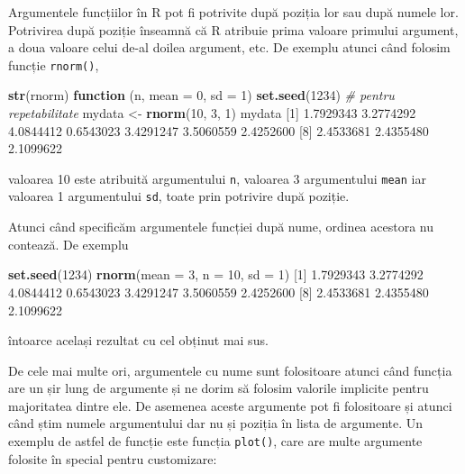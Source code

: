 \documentclass[]{article}
\newenvironment{Shaded}{\begin{snugshade}}{\end{snugshade}}
\newcommand{\CommentTok}[1]{\textcolor[rgb]{0.56,0.35,0.01}{\textit{#1}}}
\newcommand{\ControlFlowTok}[1]{\textcolor[rgb]{0.13,0.29,0.53}{\textbf{#1}}}
\newcommand{\DataTypeTok}[1]{\textcolor[rgb]{0.13,0.29,0.53}{#1}}
\newcommand{\DecValTok}[1]{\textcolor[rgb]{0.00,0.00,0.81}{#1}}
\newcommand{\FloatTok}[1]{\textcolor[rgb]{0.00,0.00,0.81}{#1}}
\newcommand{\KeywordTok}[1]{\textcolor[rgb]{0.13,0.29,0.53}{\textbf{#1}}}
\newcommand{\NormalTok}[1]{#1}
\newcommand{\StringTok}[1]{\textcolor[rgb]{0.31,0.60,0.02}{#1}}
\begin{document}
Argumentele funcțiilor în R pot fi potrivite după poziția lor sau după
numele lor. Potrivirea după poziție înseamnă că R atribuie prima valoare
primului argument, a doua valoare celui de-al doilea argument, etc. De
exemplu atunci când folosim funcție \texttt{rnorm()},

\begin{Shaded}
\begin{Highlighting}[]
\KeywordTok{str}\NormalTok{(rnorm)}
\ControlFlowTok{function}\NormalTok{ (n, }\DataTypeTok{mean =} \DecValTok{0}\NormalTok{, }\DataTypeTok{sd =} \DecValTok{1}\NormalTok{)  }
\KeywordTok{set.seed}\NormalTok{(}\DecValTok{1234}\NormalTok{) }\CommentTok{# pentru repetabilitate}
\NormalTok{mydata <-}\StringTok{ }\KeywordTok{rnorm}\NormalTok{(}\DecValTok{10}\NormalTok{, }\DecValTok{3}\NormalTok{, }\DecValTok{1}\NormalTok{) }
\NormalTok{mydata}
\NormalTok{ [}\DecValTok{1}\NormalTok{] }\FloatTok{1.7929343} \FloatTok{3.2774292} \FloatTok{4.0844412} \FloatTok{0.6543023} \FloatTok{3.4291247} \FloatTok{3.5060559} \FloatTok{2.4252600}
\NormalTok{ [}\DecValTok{8}\NormalTok{] }\FloatTok{2.4533681} \FloatTok{2.4355480} \FloatTok{2.1099622}
\end{Highlighting}
\end{Shaded}

valoarea 10 este atribuită argumentului \texttt{n}, valoarea 3
argumentului \texttt{mean} iar valoarea 1 argumentului \texttt{sd},
toate prin potrivire după poziție.

Atunci când specificăm argumentele funcției după nume, ordinea acestora
nu contează. De exemplu

\begin{Shaded}
\begin{Highlighting}[]
\KeywordTok{set.seed}\NormalTok{(}\DecValTok{1234}\NormalTok{)}
\KeywordTok{rnorm}\NormalTok{(}\DataTypeTok{mean =} \DecValTok{3}\NormalTok{, }\DataTypeTok{n =} \DecValTok{10}\NormalTok{, }\DataTypeTok{sd =} \DecValTok{1}\NormalTok{)}
\NormalTok{ [}\DecValTok{1}\NormalTok{] }\FloatTok{1.7929343} \FloatTok{3.2774292} \FloatTok{4.0844412} \FloatTok{0.6543023} \FloatTok{3.4291247} \FloatTok{3.5060559} \FloatTok{2.4252600}
\NormalTok{ [}\DecValTok{8}\NormalTok{] }\FloatTok{2.4533681} \FloatTok{2.4355480} \FloatTok{2.1099622}
\end{Highlighting}
\end{Shaded}

întoarce același rezultat cu cel obținut mai sus.

De cele mai multe ori, argumentele cu nume sunt folositoare atunci când
funcția are un șir lung de argumente și ne dorim să folosim valorile
implicite pentru majoritatea dintre ele. De asemenea aceste argumente
pot fi folositoare și atunci când știm numele argumentului dar nu și
poziția în lista de argumente. Un exemplu de astfel de funcție este
funcția \texttt{plot()}, care are multe argumente folosite în special
pentru customizare:
\end{document}
